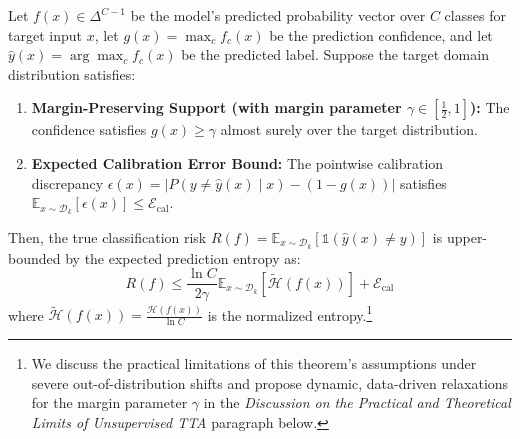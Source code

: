 \begin{theorem}
\label{thm:surrogate_to_target_bound}
Let $f(x) \in \Delta^{C-1}$ be the model's predicted probability vector over $C$
classes for target input $x$, let $g(x) = \max_c f_c(x)$ be the prediction
confidence, and let $\hat{y}(x) = \arg\max_c f_c(x)$ be the predicted label.
Suppose the target domain distribution satisfies:
\begin{enumerate}
    \item \textbf{Margin-Preserving Support (with margin parameter $\gamma \in
    [\frac{1}{2}, 1]$):} The confidence satisfies $g(x) \ge \gamma$ almost
    surely over the target distribution.
    \item \textbf{Expected Calibration Error Bound:} The pointwise calibration
    discrepancy $\epsilon(x) = \lvert P(y \neq \hat{y}(x) \mid x) - (1 - g(x))
    \rvert$ satisfies $\mathbb{E}_{x \sim \mathcal{D}_k}[\epsilon(x)] \le
    \mathcal{E}_{\text{cal}}$.
\end{enumerate}
Then, the true classification risk $R(f) = \mathbb{E}_{x \sim
\mathcal{D}_k}[\mathbb{1}(\hat{y}(x) \neq y)]$ is upper-bounded by the expected
prediction entropy as:
\begin{equation}
R(f) \le \frac{\ln C}{2\gamma} \mathbb{E}_{x \sim
\mathcal{D}_k}[\tilde{\mathcal{H}}(f(x))] + \mathcal{E}_{\text{cal}}
\end{equation}
where $\tilde{\mathcal{H}}(f(x)) = \frac{\mathcal{H}(f(x))}{\ln C}$ is the normalized entropy.\footnote{We discuss the practical limitations of this theorem's assumptions under severe out-of-distribution shifts and propose dynamic, data-driven relaxations for the margin parameter $\gamma$ in the \emph{Discussion on the Practical and Theoretical Limits of Unsupervised TTA} paragraph below.}
\end{theorem}

